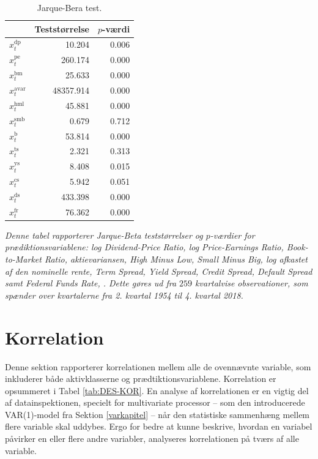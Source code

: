 \documentclass[
  a4paper,
  oneside]{memoir}
\begin{document}
\begin{table}[H]

\caption{\label{tab:JB-TILSTANDSVARIABLE}Jarque-Bera test.}
\centering
\begin{threeparttable}
\begin{tabular}[t]{lrr}
\toprule
  & Teststørrelse & $p$-værdi\\
\midrule
\rowcolor{gray!6}  $x_t^{\text{dp}}$ & 10.204 & 0.006\\
$x_t^{\text{pe}}$ & 260.174 & 0.000\\
\rowcolor{gray!6}  $x_t^{\text{bm}}$ & 25.633 & 0.000\\
$x_t^{\text{avar}}$ & 48357.914 & 0.000\\
\rowcolor{gray!6}  $x_t^{\text{hml}}$ & 45.881 & 0.000\\
$x_t^{\text{smb}}$ & 0.679 & 0.712\\
\rowcolor{gray!6}  $x_t^{\text{b}}$ & 53.814 & 0.000\\
$x_t^{\text{ts}}$ & 2.321 & 0.313\\
\rowcolor{gray!6}  $x_t^{\text{ys}}$ & 8.408 & 0.015\\
$x_t^{\text{cs}}$ & 5.942 & 0.051\\
\rowcolor{gray!6}  $x_t^{\text{ds}}$ & 433.398 & 0.000\\
$x_t^{\text{fr}}$ & 76.362 & 0.000\\
\bottomrule
\end{tabular}
\begin{tablenotes}
\item \textit{Denne tabel rapporterer Jarque-Beta teststørrelser og $p$-værdier for prædiktionsvariablene: log Dividend-Price Ratio, log Price-Earnings Ratio, Book-to-Market Ratio, aktievariansen, High Minus Low, Small Minus Big, log afkastet af den nominelle rente, Term Spread, Yield Spread, Credit Spread, Default Spread samt Federal Funds Rate, \citep{Jarque1980}. Dette gøres ud fra $259$ kvartalvise observationer, som spænder over kvartalerne fra 2. kvartal 1954 til 4. kvartal 2018.}
\end{tablenotes}
\end{threeparttable}
\end{table}

\hypertarget{korr}{%
\section{Korrelation}\label{korr}}

Denne sektion rapporterer korrelationen mellem alle de ovennævnte variable, som inkluderer både aktivklasserne og prædtiktionsvariablene. Korrelation er opsummeret i Tabel \ref{tab:DES-KOR}. En analyse af korrelationen er en vigtig del af datainspektionen, specielt for multivariate processor -- som den introducerede VAR(1)-model fra Sektion \ref{varkapitel} -- når den statistiske sammenhæng mellem flere variable skal uddybes. Ergo for bedre at kunne beskrive, hvordan en variabel påvirker en eller flere andre variabler, analyseres korrelationen på tværs af alle variable.
\end{document}
